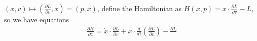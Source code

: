 \documentclass[main]{subfiles}
\begin{document}
\begin{definition}
$(x,v)\mapsto(\frac{\partial L}{\partial v},x)=(p,x)$, define the Hamiltonian as $H(x,p)=x\cdot\frac{\partial L}{\partial v}-L$, so we have equations
\begin{align*}
\frac{\partial H}{\partial x}=\dot x\cdot\frac{\partial L}{\partial v}+x\cdot\frac{d}{dt}(\frac{\partial L}{\partial v})-\frac{\partial L}{}
\end{align*}
\end{definition}
\end{document}

